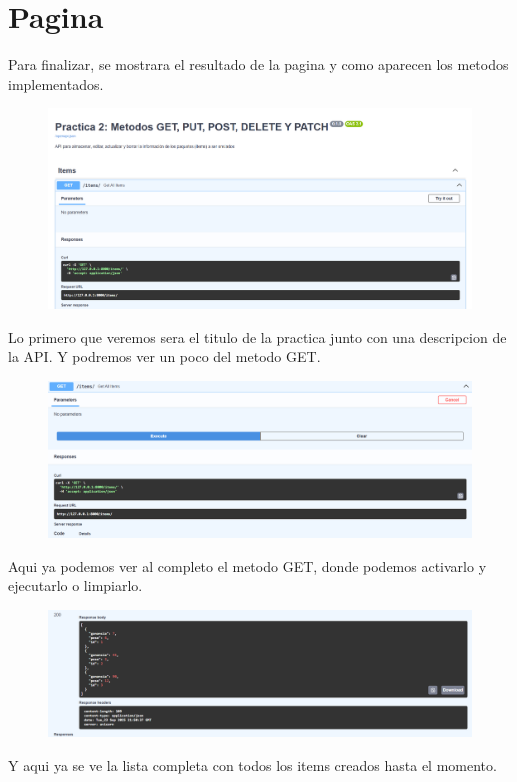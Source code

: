 \documentclass[12pt]{article}
\begin{document}
\section{Pagina}
Para finalizar, se mostrara el resultado de la pagina y como aparecen los metodos implementados.

\begin{figure}[H]
    \centering
    \includegraphics[width=1\textwidth]{Imagenes/Inicio pagina.png}
\end{figure}
Lo primero que veremos sera el titulo de la practica junto con una descripcion de la API.
Y podremos ver un poco del metodo GET.

\begin{figure}[H]
    \centering
    \includegraphics[width=1\textwidth]{Imagenes/GET1.png}
\end{figure}
Aqui ya podemos ver al completo el metodo GET, donde podemos activarlo y ejecutarlo o limpiarlo.

\begin{figure}[H]
    \centering
    \includegraphics[width=1\textwidth]{Imagenes/GET2.png}
\end{figure}
Y aqui ya se ve la lista completa con todos los items creados hasta el momento.
\end{document}
